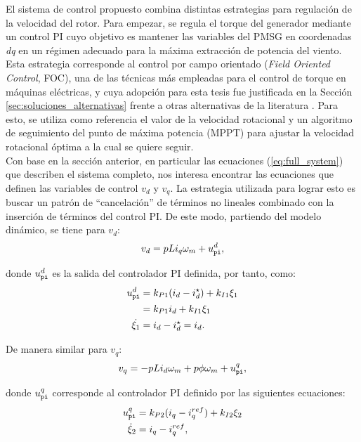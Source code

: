 El sistema de control propuesto combina distintas estrategias para regulación de la velocidad del rotor.
Para empezar, se regula el torque del generador mediante un control PI cuyo objetivo es mantener las variables
del PMSG en coordenadas \emph{dq} en un régimen adecuado para la máxima extracción de potencia del viento. Esta
estrategia corresponde al control por campo orientado (\emph{Field Oriented Control}, FOC), una de las técnicas
más empleadas para el control de torque en máquinas eléctricas, y cuya adopción para esta tesis fue justificada
en la Sección \ref{sec:soluciones_alternativas} frente a otras alternativas de la literatura
\cite{chinchilla2006,cisneros2020}. Para esto, se utiliza como referencia el valor de la velocidad rotacional y un
algoritmo de seguimiento del punto de máxima potencia (MPPT) para ajustar la velocidad rotacional óptima a la
cual se quiere seguir.
\\

Con base en la sección anterior, en particular las ecuaciones (\ref{eq:full_system}) que describen el 
sistema completo, nos interesa encontrar las ecuaciones que definen las variables de control $v_d$ y 
$v_q$. La estrategia utilizada para lograr esto es buscar un patrón de ``cancelación'' de términos 
no lineales combinado con la inserción de términos del control PI. De este modo, partiendo del modelo 
dinámico, se tiene para $v_d$:
\begin{align}
    v_d = pL i_q \omega_m + u_{\tt pi}^d \label{valUd},
\end{align}

donde $u^d_{\tt pi}$ es la salida del controlador PI definida, por tanto, como:
\begin{equation}
\begin{aligned}
    u_{\tt pi}^d &= k_{P1}(i_d-i_{d}^{\star}) + k_{I1}\xi_1\\
    &=k_{P1}i_d + k_{I1}\xi_1\\
    \dot{\xi_1} &= i_d-i_d^{\star}= i_d.
\end{aligned}
\label{eqUd}
\end{equation}

De manera similar para $v_q$:
\begin{align}
v_q = -pL i_d \omega_m + p\phi \omega_m + u_{\tt pi }^q,
\label{eqnVq}
\end{align}

donde $u_{\tt pi}^q$ corresponde al controlador PI definido por las siguientes ecuaciones:
\begin{equation}
\begin{aligned}
u^q_{\tt pi} &= k_{P2}(i_q - i_{q}^{ref}) + k_{I2}\xi_2 \\
\dot{\xi}_2 &= i_q - i_{q}^{ref},
\end{aligned}
\label{PI2}
\end{equation}

